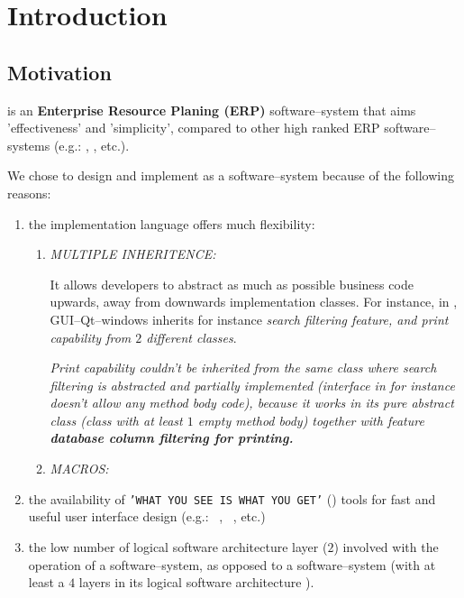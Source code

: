 \chapter{Introduction}

\section{Motivation}

\yerotherpblack is an \textbf{Enterprise Resource Planing (ERP)}
software--system that aims 'effectiveness' and 'simplicity',
compared to other high ranked ERP software--systems
(e.g.: \sageerp, \saperp, etc.).

We chose to design and implement \yerotherpblack as
a \thickclient software--system because of the
following reasons:

\begin{enumerate}[1.]

	\item the implementation language \cplusplus
		offers much flexibility:
		
		\begin{enumerate}[1.]
			\item \emph{MULTIPLE INHERITENCE:}
			
			It allows developers to abstract as much as possible
			business code upwards, away from downwards implementation
			classes. For instance,  in \yerotherpblack,
			GUI--Qt--windows inherits for instance
			\emph{search filtering feature, and print capability
			from $2$ different classes}.

			\emph{Print capability couldn't be inherited from the
			same class where search filtering is abstracted and
			partially implemented (interface in \Java for instance
			doesn't allow any method body code), because it works
			in its pure abstract class (\cplusplus class with at
			least $1$ empty method body) together with feature
			\textbf{database column filtering for printing.}}
			\newline
			
			\emph{}
		
			\item \emph{MACROS:}
		\end{enumerate}						
		
	\item the availability of \texttt{'WHAT YOU SEE IS WHAT YOU GET'}
		(\wy) tools for fast and useful
		user interface design (e.g.: \qtdesigner~\cite{qtdesigner:2020},
		\ministudio~\cite{miniStudio:2020}, etc.)
		
	\item the low number of logical software architecture
		layer ($2$) involved with the operation
		of a \thickclient software--system,	as opposed
		to a \webbrowserbased software--system
		(with at least a $4$ layers in its 
		logical software architecture ).
	
\end{enumerate}


